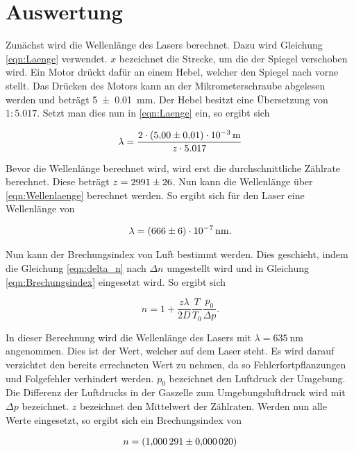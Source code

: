 %

%
\section{Auswertung}
\label{sec:Auswertung}

Zunächst wird die Wellenlänge des Lasers berechnet. Dazu wird Gleichung \eqref{eqn:Laenge} verwendet. 
$x$ bezeichnet die Strecke, um die der Spiegel verschoben wird. Ein Motor drückt dafür an einem Hebel, 
welcher den Spiegel nach vorne stellt. Das Drücken des Motors kann an der Mikrometerschraube abgelesen 
werden und beträgt \qty{5\pm0.01}{\milli \meter}. Der Hebel besitzt eine Übersetzung von $1:5.017$. Setzt man 
dies nun in \eqref{eqn:Laenge} ein, so ergibt sich 

\begin{equation}
    \label{eqn:Wellenlaenge}
    \lambda = \frac{2 \cdot \qty{5\pm0.01e-3}{\meter} }{z \cdot 5.017}
\end{equation}

\noindent Bevor die Wellenlänge berechnet wird, wird erst die durchschnittliche Zählrate berechnet. Diese 
beträgt $z = \num{2991\pm26}$. Nun kann die Wellenlänge über \eqref{eqn:Wellenlaenge} berechnet werden. So 
ergibt sich für den Laser eine Wellenlänge von 

\begin{align}
    \lambda = \qty{666\pm6e-7}{\nano \meter}.
\end{align}

\noindent Nun kann der Brechungsindex von Luft bestimmt werden. Dies geschieht, indem die Gleichung \eqref{eqn:delta_n} 
nach $\Delta n$ umgestellt wird und in Gleichung \eqref{eqn:Brechungsindex} eingesetzt wird. So ergibt sich

\begin{equation*}
    n = 1 + \frac{z \lambda}{2 D} \frac{T}{T_0}\frac{p_0}{\Delta p}.
\end{equation*}

\noindent In dieser Berechnung wird die Wellenlänge des Lasers mit $\lambda = \qty{635}{\nano \meter}$ angenommen. 
Dies ist der Wert, welcher auf dem Laser steht. Es wird darauf verzichtet den bereits errechneten Wert zu 
nehmen, da so Fehlerfortpflanzungen und Folgefehler verhindert werden. $p_0$ bezeichnet den Luftdruck der Umgebung.
Die Differenz der Luftdrucks in der Gaszelle zum Umgebungsluftdruck wird mit $\Delta p$ bezeichnet. $z$ bezeichnet 
den Mittelwert der Zählraten. Werden nun alle Werte eingesetzt, so ergibt sich ein Brechungsindex von 

\begin{align}
    n = \qty{1.000291\pm0.000020}.
\end{align}




%
